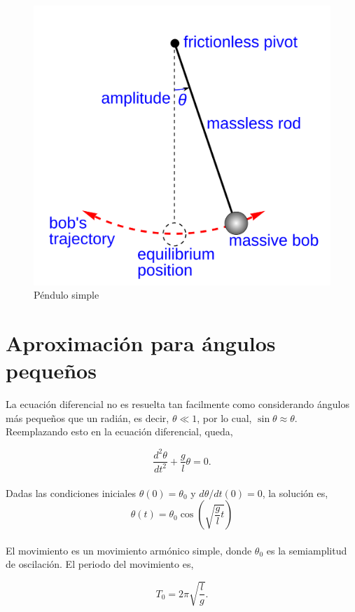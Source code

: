 \documentclass[11pt,spanish]{article}
\begin{document}
\begin{figure}[h]
\centering
\includegraphics[scale=0.1]{pend}
\caption{Péndulo simple}
\end{figure}

\section*{Aproximación para ángulos pequeños}

La ecuación diferencial no es resuelta tan facilmente como considerando ángulos más pequeños que un radián, es decir, $\theta \ll  1$, por lo cual, $\sin \theta \approx \theta$. Reemplazando esto en la ecuación diferencial, queda,

\begin{equation}
\frac{d^2\theta}{dt^2} + \frac{g}{l} \theta = 0.
\end{equation}\\
Dadas las condiciones iniciales $\theta (0) = \theta _ 0$ y $d\theta / dt (0) =0$, la solución es,
\begin{equation}
\theta (t) = \theta _0 \cos \left( \sqrt{\frac{g}{l} t} \right)
\end{equation}\\
El movimiento es un movimiento armónico simple, donde $\theta_0$ es la semiamplitud de oscilación. El periodo del movimiento es,

\begin{equation}
	T_0 = 2 \pi \sqrt{\frac{l}{g}}.
\end{equation}
\end{document}
